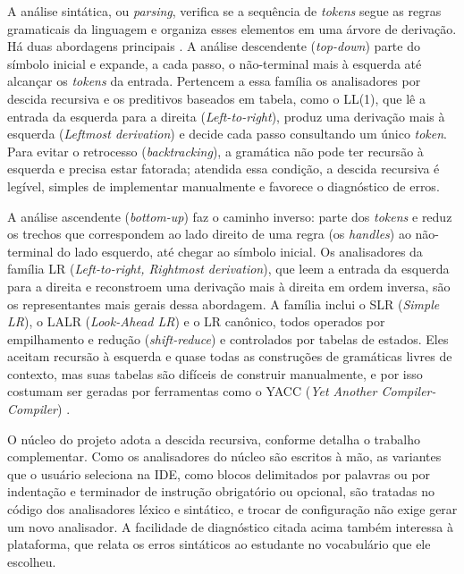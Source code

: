A análise sintática, ou \textit{parsing}, verifica se a sequência de \textit{tokens} segue as regras gramaticais da linguagem e organiza esses elementos em uma árvore de derivação. Há duas abordagens principais \cite{aho1995,cooper2012}. A análise descendente (\textit{top-down}) parte do símbolo inicial e expande, a cada passo, o não-terminal mais à esquerda até alcançar os \textit{tokens} da entrada. Pertencem a essa família os analisadores por descida recursiva e os preditivos baseados em tabela, como o LL(1), que lê a entrada da esquerda para a direita (\textit{Left-to-right}), produz uma derivação mais à esquerda (\textit{Leftmost derivation}) e decide cada passo consultando um único \textit{token}. Para evitar o retrocesso (\textit{backtracking}), a gramática não pode ter recursão à esquerda e precisa estar fatorada; atendida essa condição, a descida recursiva é legível, simples de implementar manualmente e favorece o diagnóstico de erros.

A análise ascendente (\textit{bottom-up}) faz o caminho inverso: parte dos \textit{tokens} e reduz os trechos que correspondem ao lado direito de uma regra (os \textit{handles}) ao não-terminal do lado esquerdo, até chegar ao símbolo inicial. Os analisadores da família LR (\textit{Left-to-right, Rightmost derivation}), que leem a entrada da esquerda para a direita e reconstroem uma derivação mais à direita em ordem inversa, são os representantes mais gerais dessa abordagem. A família inclui o SLR (\textit{Simple LR}), o LALR (\textit{Look-Ahead LR}) e o LR canônico, todos operados por empilhamento e redução (\textit{shift-reduce}) e controlados por tabelas de estados. Eles aceitam recursão à esquerda e quase todas as construções de gramáticas livres de contexto, mas suas tabelas são difíceis de construir manualmente, e por isso costumam ser geradas por ferramentas como o YACC (\textit{Yet Another Compiler-Compiler}) \cite{aho1995,appel2002}.

O núcleo do projeto adota a descida recursiva, conforme detalha o trabalho complementar. Como os analisadores do núcleo são escritos à mão, as variantes que o usuário seleciona na IDE, como blocos delimitados por palavras ou por indentação e terminador de instrução obrigatório ou opcional, são tratadas no código dos analisadores léxico e sintático, e trocar de configuração não exige gerar um novo analisador. A facilidade de diagnóstico citada acima também interessa à plataforma, que relata os erros sintáticos ao estudante no vocabulário que ele escolheu.

